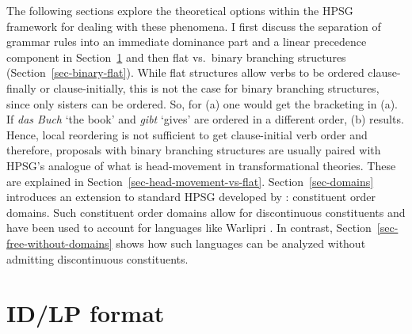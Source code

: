 \documentclass[output=paper
                ,modfonts
                ,nonflat
	        ,collection
	        ,collectionchapter
	        ,collectiontoclongg
 	        ,biblatex
                ,babelshorthands
                ,newtxmath
                ,draftmode
                ,colorlinks, citecolor=brown
]{./langsci/langscibook}
\begin{document}
The following sections explore the theoretical options within the HPSG framework for dealing with
these phenomena. I first discuss the separation of grammar rules into an immediate dominance part and
a linear precedence component in Section~\ref{sec-id-lp} and then flat vs.\ binary branching
structures (Section~\ref{sec-binary-flat}). While flat structures allow verbs to be ordered clause-finally
or clause-initially, this is not the case for binary branching structures, since only sisters can be
ordered. So, for (a) one would get the bracketing in (a). If \emph{das Buch} `the
book' and \emph{gibt} `gives' are ordered in a different order, (b) results.
\eal
{}
\zl
Hence, local reordering is not sufficient to get clause-initial verb order and therefore, proposals with binary branching
structures are usually paired with HPSG's analogue of what is head-movement in transformational
theories. These are explained in Section~\ref{sec-head-movement-vs-flat}. Section~\ref{sec-domains} introduces an extension to
standard HPSG developed by \citet{Reape94a}: constituent order domains. Such constituent
order domains allow for discontinuous constituents and have been used to account for languages like Warlipri
\citep{DS99a}. In contrast, Section~\ref{sec-free-without-domains} shows how such languages can be analyzed without admitting discontinuous constituents.


\section{ID/LP format}
\label{sec-id-lp}
\end{document}
